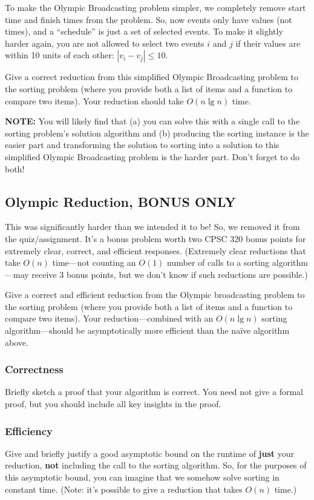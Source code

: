 \documentclass[11pt, oneside]{article}   	%
\theoremstyle{definition}
\theoremstyle{remark}
\begin{document}
To make the Olympic Broadcasting problem simpler, we completely remove
start time and finish times from the problem. So, now events only have
values (not times), and a ``schedule'' is just a set of selected
events. To make it slightly harder again, you are not allowed to
select two events $i$ and $j$ if their values are within 10 units of
each other: $|v_i - v_j| \leq 10$.

Give a correct reduction from this simplified Olympic Broadcasting
problem to the sorting problem (where you provide both a list of items
and a function to compare two items). Your reduction should take $O(n
\lg n)$ time.

\textbf{NOTE:} You will likely find that (a) you can solve this with a single
call to the sorting problem's solution algorithm and (b) producing the
sorting instance is the easier part and transforming the solution to
sorting into a solution to this simplified Olympic Broadcasting
problem is the harder part. Don't forget to do both!
\subsection{Olympic Reduction, BONUS ONLY}

This was significantly harder than we intended it to be! So, we
removed it from the quiz/assignment. It's a bonus problem worth two
CPSC 320 bonus points for extremely clear, correct, and efficient
responses. (Extremely clear reductions that take $O(n)$ time---not
counting an $O(1)$ number of calls to a sorting algorithm---may
receive 3 bonus points, but we don't know if such reductions are
possible.)

Give a correct and efficient reduction from the Olympic broadcasting
problem to the sorting problem (where you provide both a list of items
and a function to compare two items). Your reduction---combined with
an $O(n \lg n)$ sorting algorithm---should be asymptotically more
efficient than the na\"ive algorithm above.
\subsubsection{Correctness}

Briefly sketch a proof that your algorithm is correct. You need not
give a formal proof, but you should include all key insights in the
proof.
\subsubsection{Efficiency}

Give and briefly justify a good asymptotic bound on the runtime
of \textbf{just} your reduction, \textbf{not} including the call to the sorting
algorithm. So, for the purposes of this asymptotic bound, you can
imagine that we somehow solve sorting in constant time. (Note: it's
possible to give a reduction that takes $O(n)$ time.)
\end{document}
